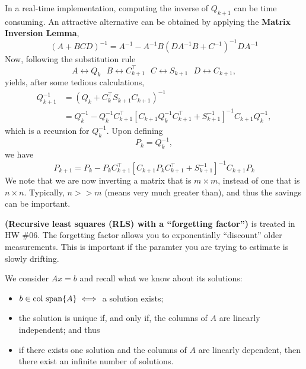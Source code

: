 In a real-time implementation, computing the inverse of $Q_{k+1}$ can be time consuming. An attractive alternative can be obtained by applying the \textbf{Matrix Inversion Lemma},
    \begin{equation*}
        \left(A+BCD\right)^{-1}=A^{-1}-A^{-1}B\left(DA^{-1}B+C^{-1}\right)^{-1}DA^{-1}
    \end{equation*}
  Now, following the substitution rule 
  \begin{equation*}
        A\leftrightarrow Q_k\ \ \ B\leftrightarrow C_{k+1}^\top\ \ \ C\leftrightarrow S_{k+1}\ \ \ D\leftrightarrow C_{k+1},
    \end{equation*}
yields, after some tedious calculations, 
    \begin{align*}
        Q_{k+1}^{-1}&=\left(Q_k+C_k^\top S_{k+1}C_{k+1}\right)^{-1}\\
        &=Q_k^{-1}-Q_k^{-1}C_{k+1}^\top\left[C_{k+1}Q_k^{-1}C_{k+1}^\top+S_{k+1}^{-1}\right]^{-1}C_{k+1}Q_k^{-1},
    \end{align*}
    which is a recursion for $Q_k^{-1}$. Upon defining
    \begin{equation*}
        P_k=Q_k^{-1},
    \end{equation*}
    we have
    \begin{equation*}
        P_{k+1}=P_k-P_kC_{k+1}^\top\left[C_{k+1}P_kC_{k+1}^\top+S_{k+1}^{-1}\right]^{-1}C_{k+1}P_k
    \end{equation*}
    We note that we are now inverting a matrix that is $m\times m$, instead of one that is $n\times n$. Typically, $n>>m$ (means very much greater than), and thus the savings can be important. 
    
    \Qed
    
    \begin{rem}
\textbf{(Recursive least squares (RLS) with a ``forgetting factor'')}
is treated in HW \#06. The forgetting factor allows you to exponentially ``discount'' older measurements. This is important if the paramter you are trying to estimate is slowly drifting.
    \end{rem}

We consider $Ax=b$ and recall what we know about its solutions:
\begin{itemize}
    \item $b \in \mathrm{col~span} \{ A \} \iff$ a solution exists;
    \item the solution is unique if, and only if, the columns of $A$ are linearly independent; and thus
    \item if there exists one solution and the columns of $A$ are linearly dependent, then there exist an infinite number of solutions.
\end{itemize} 


